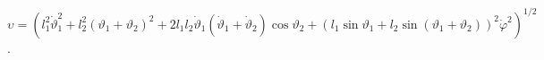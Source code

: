 $\upsilon = \left(l^2_1 \dot{\vartheta}^2_1 +
l^2_2(\vartheta _1 + \vartheta _2)^2 +
2l_1l_2\dot{\vartheta}_1(\dot{\vartheta}_1 +
\dot{\vartheta}_2)\cos{\vartheta_2} +
(l_1\sin{\vartheta _1} + l_2\sin{(\vartheta _1 + \vartheta _2)})^2
\dot{\varphi}^2\right) ^{1/2}$.
